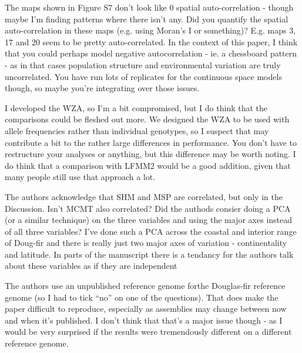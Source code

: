 \begin{point}{} %
The maps shown in Figure S7 don't look like 0 spatial auto-correlation - though maybe I'm finding patterns where there isn't any. Did you quantify the spatial auto-correlation in these maps (e.g. using Moran's I or something)? E.g. maps 3, 17 and 20 seem to be pretty auto-correlated. In the context of this paper, I think that you could perhaps model negative autocorrelation - ie. a chessboard pattern - as in that cases population structure and environmental variation are truly uncorrelated. You have run lots of replicates for the continuous space models though, so maybe you're integrating over those issues.
\end{point}


\begin{point}{} %
I developed the WZA, so I'm a bit compromised, but I do think that the comparisons could be fleshed out more. We designed the WZA to be used with allele frequencies rather than individual genotypes, so I suspect that may contribute a bit to the rather large differences in performance. You don't have to restructure your analyses or anything, but this difference may be worth noting. I do think that a comparison with LFMM2 would be a good addition, given that many people still use that approach a lot.
\end{point}


\begin{point}{} %
The authors acknowledge that SHM and MSP are correlated, but only in the Discussion. Isn't MCMT also correlated? Did the authods consier doing a PCA (or a similar technique) on the three variables and using the major axes instead of all three variables? I've done such a PCA across the coastal and interior range of Doug-fir and there is really just two major axes of variation - continentality and latitude. In parts of the manuscript there is a tendancy for the authors talk about these variables as if they are independent
\end{point}


\begin{point}{} %
The authors use an unpublished reference genome forthe Douglas-fir reference genome (so I had to tick ``no'' on one of the questions). That does make the paper difficult to reproduce, especially as assemblies may change between now and when it's published. I don't think that that's a major issue though - as I would be very surprised if the results were tremendously different on a different reference genome.
\end{point}

